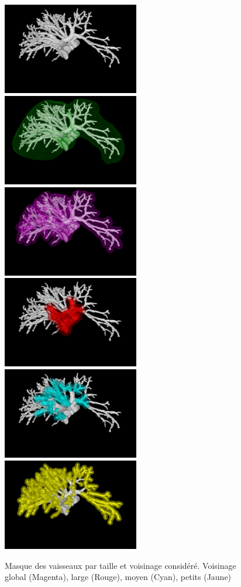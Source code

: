 \begin{figure}[h]
  \centering
  \includegraphics[height=4cm]{Images/vs_gt.png}
  \includegraphics[height=4cm]{Images/vs_gt_liver.png}
  \includegraphics[height=4cm]{Images/vs_VN.png}
  \includegraphics[height=4cm]{Images/vs_large.png}
  \includegraphics[height=4cm]{Images/vs_medium.png}
  \includegraphics[height=4cm]{Images/vs_small.png}
  \caption{Masque des vaisseaux par taille et voisinage considéré. Voisinage global (Magenta), large (Rouge), moyen (Cyan), petits (Jaune)}
  \label{fig:vs_masks}
\end{figure}

